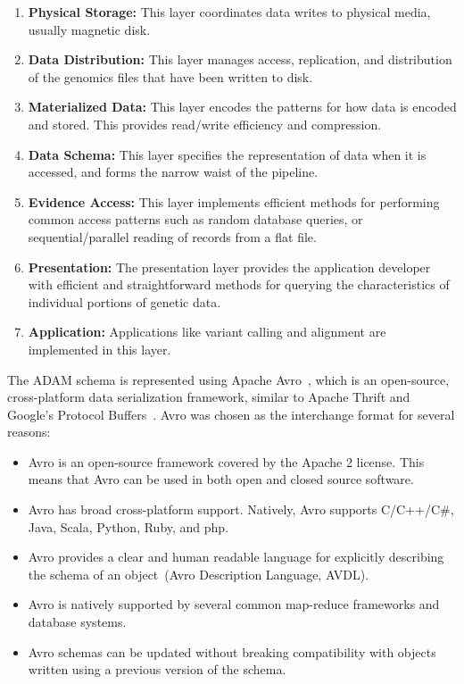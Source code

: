 \documentclass{bioinfo}
\begin{document}
\begin{enumerate}
\item {\bf Physical Storage:} This layer coordinates data writes to physical media, usually magnetic disk.
\item {\bf Data Distribution:} This layer manages access, replication, and distribution of the genomics files that have been written to disk.
\item {\bf Materialized Data:} This layer encodes the patterns for how data is encoded and stored. This provides read/write efficiency
and compression.
\item {\bf Data Schema:} This layer specifies the representation of data when it is accessed, and forms the narrow waist of the pipeline.
\item {\bf Evidence Access:} This layer implements efficient methods for performing common access patterns such as random database
queries, or sequential/parallel reading of records from a flat file.
\item {\bf Presentation:} The presentation layer provides the application developer with efficient and
straightforward methods for querying the characteristics of individual portions of genetic data.
\item {\bf Application:} Applications like variant calling and alignment are implemented in this layer.
\end{enumerate}

The ADAM schema is represented using Apache Avro~\citep{avro}, which is an open-source, cross-platform data serialization framework, similar
to Apache Thrift and Google's Protocol Buffers~\citep{thrift, protobuf}. Avro was chosen as the interchange format for several reasons:

\begin{itemize}
\item Avro is an open-source framework covered by the Apache 2 license. This means that Avro can be used in both open and closed source software.
\item Avro has broad cross-platform support. Natively, Avro supports C/C++/C\#, Java, Scala, Python, Ruby, and php.
\item Avro provides a clear and human readable language for explicitly describing the schema of an object~(Avro Description Language, AVDL).
\item Avro is natively supported by several common map-reduce frameworks and database systems.
\item Avro schemas can be updated without breaking compatibility with objects written using a previous version of the schema.
\end{itemize}
\end{document}
